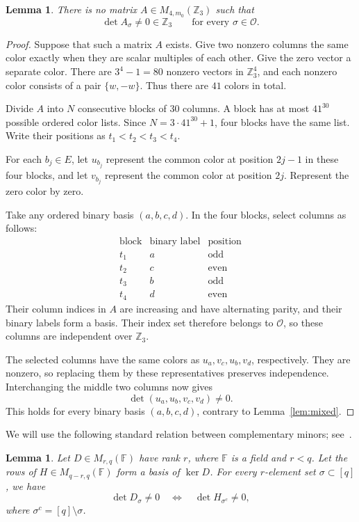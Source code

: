 \documentclass{amsart}
\theoremstyle{plain}
\newtheorem{lemma}[theorem]{Lemma}
\numberwithin{equation}{section}
\theoremstyle{remark}
\theoremstyle{definition}
\newcommand{\Z}{\mathbb Z}
\newcommand{\F}{\mathbb F}
\newcommand{\cO}{\mathcal O}
\begin{document}
\begin{lemma}\label{lem:repeat}
    There is no matrix $A\in M_{4,m_0}(\Z_3)$ such that
    $$
        \det A_\sigma\ne0 \in \Z_3 \qquad\text{for every }\sigma\in\cO.
    $$
\end{lemma}
\begin{proof}
    Suppose that such a matrix $A$ exists.
    Give two nonzero columns the same color exactly when they are scalar multiples of each other.
    Give the zero vector a separate color.
    There are $3^4-1=80$ nonzero vectors in $\Z_3^4$, and each nonzero color consists of a pair $\{w,-w\}$.
    Thus there are $41$ colors in total.
    
    Divide $A$ into $N$ consecutive blocks of $30$ columns.
    A block has at most $41^{30}$ possible ordered color lists.
    Since $N=3\cdot41^{30}+1$, four blocks have the same list.
    Write their positions as $t_1<t_2<t_3<t_4$.
    
    For each $b_j\in E$, let $u_{b_j}$ represent the common color at position $2j-1$ in these four blocks, and let $v_{b_j}$ represent the common color at position $2j$.
    Represent the zero color by zero.
    
    Take any ordered binary basis $(a,b,c,d)$.
    In the four blocks, select columns as follows:
    \[
    \begin{array}{c|c|c}
        \text{block} & \text{binary label} & \text{position}\\ \hline
        t_1 & a & \text{odd}\\
        t_2 & c & \text{even}\\
        t_3 & b & \text{odd}\\
        t_4 & d & \text{even}
    \end{array}
    \]
    Their column indices in $A$ are increasing and have alternating parity, and their binary labels form a basis.
    Their index set therefore belongs to $\cO$, so these columns are independent over $\Z_3$.
    
    The selected columns have the same colors as $u_a,v_c,u_b,v_d$, respectively.
    They are nonzero, so replacing them by these representatives preserves independence. 
    Interchanging the middle two columns now gives
    $$
        \det(u_a,u_b,v_c,v_d)\ne0.
    $$
    This holds for every binary basis $(a,b,c,d)$, contrary to Lemma~\ref{lem:mixed}.
\end{proof}

We will use the following standard relation between complementary minors; see~\cite[Theorem~2.2.8]{Oxley2011book}.
\begin{lemma}\label{lem:complementary-minors}
    Let $D\in M_{r,q}(\F)$ have rank $r$, where $\F$ is a field and $r<q$.
    Let the rows of $H\in M_{q-r,q}(\F)$ form a basis of $\ker D$.
    For every $r$-element set $\sigma\subset[q]$, we have
    $$
        \det D_\sigma\ne0 \quad\Longleftrightarrow\quad \det H_{\sigma^c}\ne0,
    $$
    where $\sigma^c=[q]\setminus\sigma$.
\end{lemma}
\end{document}
